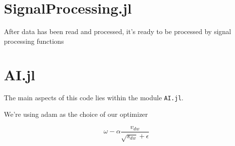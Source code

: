 




\section{SignalProcessing.jl}

After data has been read and processed, it's ready to be processed by signal processing functions 

\section{AI.jl}

The main aspects of this code lies within the module \texttt{AI.jl}. 






We're using \acrfull{adam} as the choice of our optimizer

\begin{equation}
    \omega - \alpha \frac{v_{dw}}  {\sqrt{s_{dw}} + \epsilon}
\end{equation}



